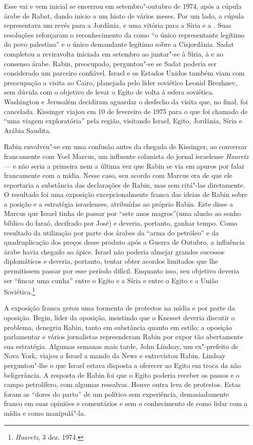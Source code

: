 Esse vai e vem inicial se encerrou em setembro"-outubro de 1974, após a
cúpula árabe de Rabat, dando inicio a um hiato de vários meses. Por um
lado, a cúpula representava um revés para a Jordânia, e uma vitória para
a Síria e a . Suas resoluções reforçaram o reconhecimento da  como
``o único representante legítimo do povo palestino'' e o único
demandante legítimo sobre a Cisjordânia. Sadat completou a reviravolta
iniciada em setembro ao juntar"-se à Síria, à  e ao consenso árabe.
Rabin, preocupado, perguntou"-se se Sadat poderia ser considerado um
parceiro confiável. Israel e os Estados Unidos também viam com
preocupação a visita ao Cairo, planejada pelo líder soviético Leonid
Brezhnev, sem dúvida com o objetivo de levar o Egito de volta à esfera
soviética. Washington e Jerusalém decidiram aguardar o desfecho da
visita que, no final, foi cancelada. Kissinger viajou em 10 de fevereiro
de 1975 para o que foi chamado de ``uma viagem exploratória'' pela
região, visitando Israel, Egito, Jordânia, Síria e Arábia Saudita.

Rabin envolveu"-se em uma confusão antes da chegada de Kissinger, ao
conversar francamente com Yoel Marcus, um influente colunista do jornal
israelense \emph{Haaretz} --- e não seria a primeira nem a última
vez que Rabin se via em apuros por falar francamente com a mídia.
Nesse caso, seu acordo com Marcus era de que ele reportaria a substância
das declarações de Rabin, mas sem citá"-las diretamente. O resultado foi
uma exposição excepcionalmente franca das ideias de Rabin sobre a
posição e a estratégia israelenses, atribuídas ao próprio Rabin. Este
disse a Marcus que Israel tinha de passar por ``sete anos magros''(uma
alusão ao sonho bíblico do faraó, decifrado por José) e deveria,
portanto, ganhar tempo. Como resultado da utilização por parte dos
árabes da ``arma do petróleo'' e da quadruplicação dos preços desse
produto após a Guerra de Outubro, a influência árabe havia chegado ao
ápice. Israel não poderia almejar grandes sucessos diplomáticos e
deveria, portanto, tentar obter acordos limitados que lhe permitissem
passar por esse período difícil. Enquanto isso, seu objetivo deveria ser
``fincar uma cunha'' entre o Egito e a Síria e entre o Egito e a União
Soviética.\footnote{\emph{Haaretz}, 3 dez. 1974.}

A exposição franca gerou uma tormenta de protestos na mídia e por parte
da oposição. Begin, líder da oposição, insistindo que o Knesset deveria
discutir o problema, denegriu Rabin, tanto em substância quanto em
estilo; a oposição parlamentar e vários jornalistas repreenderam Rabin
por expor tão abertamente sua estratégia. Algumas semanas mais tarde,
John Lindsay, um ex"-prefeito de Nova York, viajou a Israel a mando da
 News e entrevistou Rabin. Lindsay perguntou"-lhe o que Israel estava
disposta a oferecer ao Egito em troca da não beligerância. A resposta de
Rabin foi que o Egito poderia receber os passos e o campo petrolífero,
com algumas ressalvas. Houve outra leva de protestos. Estas foram as
``dores do parto'' de um político sem experiência, demasiadamente franco
em suas opiniões e comentários e sem o conhecimento de como lidar com a
mídia e como manipulá"-la.

